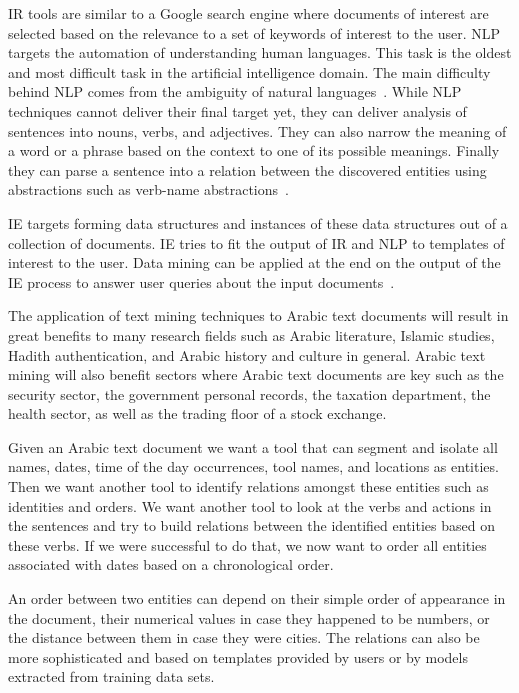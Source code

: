 \documentclass[12pt]{article}
\begin{document}
IR tools are similar to a Google search 
engine where documents of interest are selected based on the 
relevance to a set of keywords of interest to the user.
NLP targets the automation of understanding human languages.
This task is the oldest and most difficult task in the artificial 
intelligence domain.
The main difficulty behind NLP comes from the ambiguity of 
natural languages~\cite{Osm08}.
While NLP techniques cannot deliver their final target yet, they 
can deliver analysis of sentences into nouns, verbs, 
and adjectives.
They can also narrow the meaning of a word or a phrase based on 
the context to one of its possible meanings.
Finally they can parse a sentence into a relation between the 
discovered entities using abstractions such as verb-name 
abstractions~\cite{Osm08}.

IE targets forming data structures and instances of these 
data structures out of a collection of documents.
IE tries to fit the output of IR and NLP to templates of 
interest to the user.
Data mining can be applied at the end on the output of the 
IE process to answer user queries about the input 
documents~\cite{JHa05}.


The application of text mining techniques to Arabic text documents 
will result in great benefits to many research fields such as 
Arabic literature,
Islamic studies, Hadith authentication, and Arabic history and 
culture in general.
Arabic text mining will also benefit sectors where Arabic text 
documents are key such as the security sector,
the government personal records,
the taxation department,
the health sector,
as well as the trading floor of a stock exchange.
 
Given an Arabic text document we want a tool that can segment 
and isolate all names, dates, time of the day occurrences,
tool names, and locations as entities.
Then we want another tool to identify relations amongst 
these entities such as identities and orders.
We want another tool to look at the verbs and actions in 
the sentences and try to build relations between the identified 
entities based on these verbs.
If we were successful to do that,
we now want to order all entities associated with dates based 
on a chronological order.

An order between two entities can depend on 
their simple order of appearance in the document, their 
numerical values in case they happened to be numbers, or
the distance between them in case they were cities. 
The relations can also be more sophisticated and 
based on templates provided by users or by 
models extracted from training data sets. 
\end{document}
